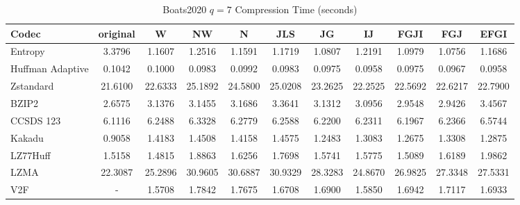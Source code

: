 \documentclass{article}
\begin{document}
\begin{table}[h!]
\centering
\caption{Boats2020 $q=7$ Compression Time (seconds)}
\begin{tabular}{|l|cccccccccc|}
\hline
Codec &  original &       W &      NW &       N &     JLS &      JG &      IJ &    FGJI &     FGJ &    EFGI \\
\hline
Entropy & 3.3796 & 1.1607 & 1.2516 & 1.1591 & 1.1719 & 1.0807 & 1.2191 & 1.0979 & 1.0756 & 1.1686         \\
\hline
Huffman Adaptive &    0.1042 &  0.1000 &  0.0983 &  0.0992 &  0.0983 &  0.0975 &  0.0958 &  0.0975 &  0.0967 &  0.0958 \\
Zstandard        &   21.6100 & 22.6333 & 25.1892 & 24.5800 & 25.0208 & 23.2625 & 22.2525 & 22.5692 & 22.6217 & 22.7900 \\
BZIP2            &    2.6575 &  3.1376 &  3.1455 &  3.1686 &  3.3641 &  3.1312 &  3.0956 &  2.9548 &  2.9426 &  3.4567 \\
CCSDS 123        &    6.1116 &  6.2488 &  6.3328 &  6.2779 &  6.2588 &  6.2200 &  6.2311 &  6.1967 &  6.2366 &  6.5744 \\
Kakadu           &    0.9058 &  1.4183 &  1.4508 &  1.4158 &  1.4575 &  1.2483 &  1.3083 &  1.2675 &  1.3308 &  1.2875 \\
LZ77Huff         &    1.5158 &  1.4815 &  1.8863 &  1.6256 &  1.7698 &  1.5741 &  1.5775 &  1.5089 &  1.6189 &  1.9862 \\
LZMA             &   22.3087 & 25.2896 & 30.9605 & 30.6887 & 30.9329 & 28.3283 & 24.8670 & 26.9825 & 27.3348 & 27.5331 \\
V2F              &    - &  1.5708 &  1.7842 &  1.7675 &  1.6708 &  1.6900 &  1.5850 &  1.6942 &  1.7117 &  1.6933 \\
\hline
\end{tabular}
\end{table}

\newpage
\end{document}
